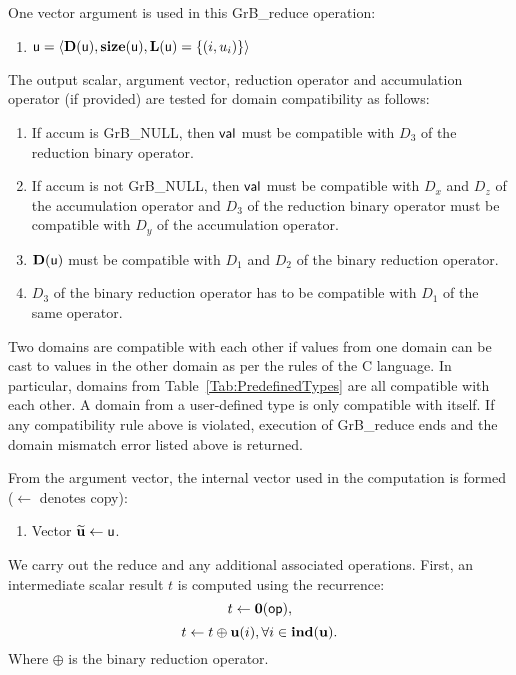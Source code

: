 One vector argument is used in this {\sf GrB\_reduce} operation:
\begin{enumerate}
	\item ${\sf u} = \langle \bold{D}({\sf u}),\bold{size}({\sf u}),
    \bold{L}({\sf u}) = \{(i,u_i) \} \rangle$

\end{enumerate}

The output scalar, argument vector, reduction operator and accumulation 
operator (if provided) are tested for domain compatibility as follows:
\begin{enumerate}

	\item If {\sf accum} is {\sf GrB\_NULL}, then ${\sf val}$ must be 
    compatible with $D_3$ of the reduction binary operator.

	\item If {\sf accum} is not {\sf GrB\_NULL}, then ${\sf val}$ must be
    compatible with $D_x$ and $D_z$ of the accumulation operator and 
    $D_3$ of the reduction binary operator must be compatible with $D_y$ of the accumulation operator.

	\item $\bold{D}({\sf u})$ must be compatible with $D_1$ and $D_2$ of the binary reduction operator.

        \item $D_3$ of the binary reduction operator has to be compatible with $D_1$ of the same operator.
\end{enumerate}
Two domains are compatible with each other if values from one domain can be cast 
to values in the other domain as per the rules of the C language.
In particular, domains from Table~\ref{Tab:PredefinedTypes} are all compatible 
with each other. A domain from a user-defined type is only compatible with itself.
If any compatibility rule above is violated, execution of {\sf GrB\_reduce} ends
and the domain mismatch error listed above is returned.

From the argument vector, the internal vector used in 
the computation is formed ($\leftarrow$ denotes copy):
\begin{enumerate}
	\item Vector ${\bf \widetilde{u}} \leftarrow {\sf u}$.
\end{enumerate}

We carry out the reduce and any additional 
associated operations.  
First, an intermediate scalar result $t$ is computed using the recurrence:
\[
	t \leftarrow \bold{0}({\sf op}),
\]
\[
	t \leftarrow t \oplus {\bf u}(i), \forall i \in \bold{ind}({\bf u}). 
\]
Where $\oplus$ is the binary reduction operator.

